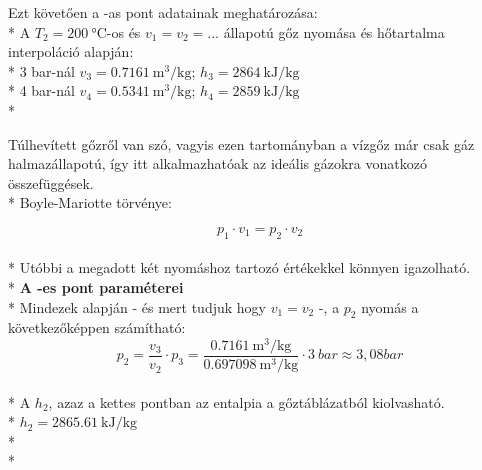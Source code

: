 \noindent Ezt követően a -as pont adatainak meghatározása: \\*
\noindent
\vspace{0,5cm}
A $T_2 ={\SI{200}{\celsius}}$-os és $v_1=v_2=$... állapotú gőz nyomása és hőtartalma interpoláció alapján: \\*
3 bar-nál $v_3={\SI{0,7161}{\meter\cubed\per\kilogram}}$; \quad $h_3={\SI{2864}{\kJ\per\kilogram}}$ \\*
4 bar-nál $v_4={\SI{0,5341}{\meter\cubed\per\kilogram}}$; \quad $h_4={\SI{2859}{\kJ\per\kilogram}}$ \\*
\noindent


Túlhevített gőzről van szó, vagyis ezen tartományban a vízgőz már csak gáz halmazállapotú, így itt alkalmazhatóak az ideális gázokra vonatkozó összefüggések. \\*
Boyle-Mariotte törvénye:


\begin{equation*}
p_1\cdot v_1=p_2\cdot v_2
\end{equation*} \\*
\vspace{0,5cm}
\noindent
Utóbbi a megadott két nyomáshoz tartozó értékekkel könnyen igazolható. \\*
\textbf {A -es pont paraméterei} \\*
 Mindezek alapján - és mert tudjuk hogy $v_1=v_2$ -, a $p_2$ nyomás a következőképpen számítható: 
\begin{equation}
p_2=\frac{v_3}{v_2}\cdot p_3=\frac{{\SI{0,7161}{\meter\cubed\per\kilogram}}}{\SI{0,697098}{\meter\cubed\per\kilogram}}\cdot {\SI{3}{bar}}\approx 3,08 bar
\end{equation} \\*
A $h_2$, azaz a kettes pontban az entalpia a gőztáblázatból kiolvasható. \\*
$h_2={\SI{2865,61}{\kJ\per\kilogram}}$
 \\*
 \\*



